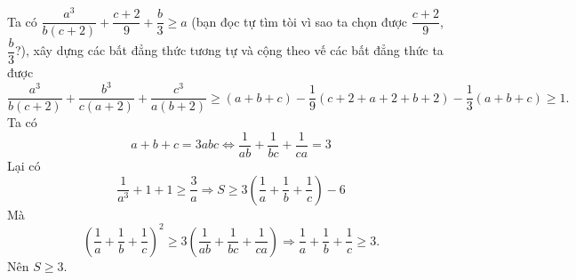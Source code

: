 \hda  Ta có $\dfrac{{{a}^{3}}}{b\left( c+2 \right)}+\dfrac{c+2}{9}+\dfrac{b}{3}\ge a$ (bạn đọc tự tìm tòi vì sao ta chọn được $\dfrac{c+2}{9}$, $\dfrac{b}{3}$?), xây dựng các bất đẳng thức tương tự và cộng theo vế các bất đẳng thức ta được
\[\frac{{{a}^{3}}}{b\left( c+2 \right)}+\frac{{{b}^{3}}}{c\left( a+2 \right)}+\frac{{{c}^{3}}}{a\left( b+2 \right)}\ge \left( a+b+c \right)-\frac{1}{9}\left( c+2+a+2+b+2 \right)-\frac{1}{3}\left( a+b+c \right)\ge 1.\]
\hda  Ta có $$a+b+c=3abc\Leftrightarrow \dfrac{1}{ab}+\dfrac{1}{bc}+\dfrac{1}{ca}=3$$
Lại có $$\dfrac{1}{{{a}^{3}}}+1+1\ge \dfrac{3}{a}\Rightarrow S\ge 3\left( \dfrac{1}{a}+\dfrac{1}{b}+\dfrac{1}{c} \right)-6$$
Mà \[{{\left( \frac{1}{a}+\frac{1}{b}+\frac{1}{c} \right)}^{2}}\ge 3\left( \frac{1}{ab}+\frac{1}{bc}+\frac{1}{ca} \right)\Rightarrow \frac{1}{a}+\frac{1}{b}+\frac{1}{c}\ge 3.\]
Nên $S\ge 3$.
